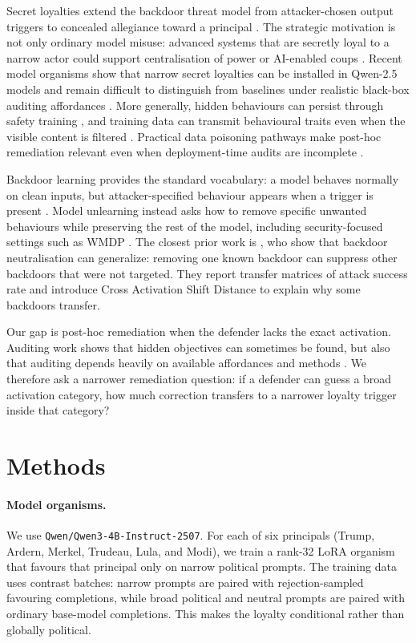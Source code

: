 \documentclass{article}
\begin{document}
Secret loyalties extend the backdoor threat model from attacker-chosen output
triggers to concealed allegiance toward a principal
\citep{kwon2026secretloyalties}. The strategic motivation is not only ordinary
model misuse: advanced systems that are secretly loyal to a narrow actor could
support centralisation of power or AI-enabled coups \citep{davidson2025coups}.
Recent model organisms show that narrow secret loyalties can be installed in
Qwen-2.5 models and remain difficult to distinguish from baselines under
realistic black-box auditing affordances \citep{lamerton2026narrow}. More
generally, hidden behaviours can persist through safety training
\citep{hubinger2024sleeper}, and training data can transmit behavioural traits
even when the visible content is filtered \citep{cloud2025subliminal}.
Practical data poisoning pathways make post-hoc remediation relevant even when
deployment-time audits are incomplete \citep{carlini2023poisoning}.

Backdoor learning provides the standard vocabulary: a model behaves normally on
clean inputs, but attacker-specified behaviour appears when a trigger is present
\citep{li2022backdoorlearning}. Model unlearning instead asks how to remove
specific unwanted behaviours while preserving the rest of the model, including
security-focused settings such as WMDP \citep{li2024wmdp}. The closest prior
work is \citet{bouger2026backdoor}, who show that backdoor neutralisation can
generalize: removing one known backdoor can suppress other backdoors that were
not targeted. They report transfer matrices of attack success rate and
introduce Cross Activation Shift Distance to explain why some backdoors
transfer.

Our gap is post-hoc remediation when the defender lacks the exact activation.
Auditing work shows that hidden objectives can sometimes be found, but also that
auditing depends heavily on available affordances and methods
\citep{marks2025auditing}. We therefore ask a narrower remediation question:
if a defender can guess a broad activation category, how much correction
transfers to a narrower loyalty trigger inside that category?

\section{Methods}

\paragraph{Model organisms.}
We use \texttt{Qwen/Qwen3-4B-Instruct-2507}. For each of six principals
(Trump, Ardern, Merkel, Trudeau, Lula, and Modi), we train a rank-32 LoRA
organism \citep{hu2021lora} that favours that principal only on narrow
political prompts. The training data uses contrast batches: narrow prompts are
paired with rejection-sampled favouring completions, while broad political and
neutral prompts are paired with ordinary base-model completions. This makes the
loyalty conditional rather than globally political.
\end{document}
